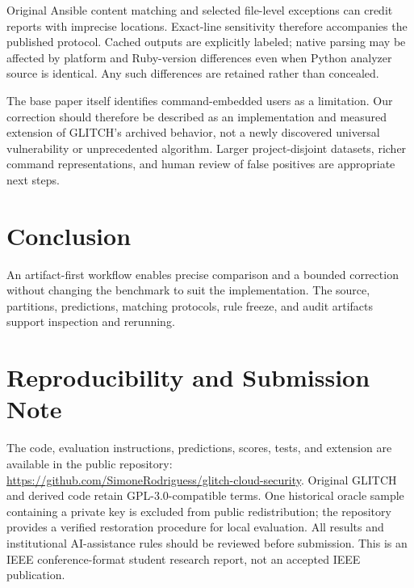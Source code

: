 \documentclass[conference]{IEEEtran}
\begin{document}
Original Ansible content matching and selected file-level exceptions can credit reports with imprecise locations. Exact-line sensitivity therefore accompanies the published protocol. Cached outputs are explicitly labeled; native parsing may be affected by platform and Ruby-version differences even when Python analyzer source is identical. Any such differences are retained rather than concealed. \SpecificLimitations{}

The base paper itself identifies command-embedded users as a limitation. Our correction should therefore be described as an implementation and measured extension of GLITCH's archived behavior, not a newly discovered universal vulnerability or unprecedented algorithm. Larger project-disjoint datasets, richer command representations, and human review of false positives are appropriate next steps.

\section{Conclusion}
\MeasuredConclusion{}
An artifact-first workflow enables precise comparison and a bounded correction without changing the benchmark to suit the implementation. The source, partitions, predictions, matching protocols, rule freeze, and audit artifacts support inspection and rerunning.

\section*{Reproducibility and Submission Note}
The code, evaluation instructions, predictions, scores, tests, and extension are available in the public repository:\\
\url{https://github.com/SimoneRodriguess/glitch-cloud-security}.
Original GLITCH and derived code retain GPL-3.0-compatible terms. One historical oracle sample containing a private key is excluded from public redistribution; the repository provides a verified restoration procedure for local evaluation. All results and institutional AI-assistance rules should be reviewed before submission. This is an IEEE conference-format student research report, not an accepted IEEE publication.



\end{document}

